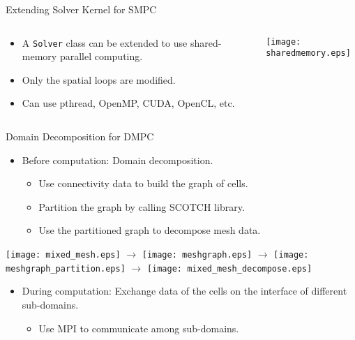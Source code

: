 \documentclass[dvips,xcolor=pst,14pt]{beamer}
\begin{document}
\begin{frame}{
%
Extending Solver Kernel for SMPC
%
}
\begin{columns}[c]
\begin{column}{.75\textwidth}
\begin{itemize}
  \item A \texttt{Solver} class can be extended to use shared-memory parallel
  computing.
  \item Only the spatial loops are modified.
  \item Can use pthread, OpenMP, CUDA, OpenCL, etc.
\end{itemize}
\end{column}
\begin{column}{.25\textwidth} \centering
  \texttt{[image: sharedmemory.eps]}
\end{column}
\end{columns}
\end{frame}

\begin{frame}{
%
Domain Decomposition for DMPC
%
}
\begin{itemize}
  \item Before computation: Domain decomposition.
  \begin{itemize}
    \item Use connectivity data to build the graph of cells.
    \item Partition the graph by calling SCOTCH library.
    \item Use the partitioned graph to decompose mesh data.
  \end{itemize}
\end{itemize}
\begin{center} \scriptsize
  \texttt{[image: mixed\_mesh.eps]}
  $\rightarrow$
  \texttt{[image: meshgraph.eps]}
  $\rightarrow$
  \texttt{[image: meshgraph\_partition.eps]}
  $\rightarrow$
  \texttt{[image: mixed\_mesh\_decompose.eps]}
\end{center}
\begin{itemize}
  \item During computation: Exchange data of the cells on the interface of
  different sub-domains.
  \begin{itemize}
    \item Use MPI to communicate among sub-domains.
  \end{itemize}
\end{itemize}
\end{frame}
\end{document}
